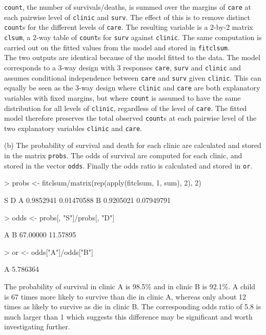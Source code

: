 \documentclass[a4paper,11pt]{article}
\begin{document}
\texttt{count}, the number of survivals/deaths, is summed over the margins of \texttt{care} at each pairwise level of \texttt{clinic} and \texttt{surv}. The effect of this is to remove distinct \texttt{count}s for the different levels of \texttt{care}. The resulting variable is a 2-by-2 matrix \texttt{clsum}, a 2-way table of \texttt{count}s for \texttt{surv} against \texttt{clinic}. The same computation is carried out on the fitted values from the model and stored in \texttt{fitclsum}.\\
The two outputs are identical because of the model fitted to the data. The model corresponds to a 3-way design with 3 responses \texttt{care}, \texttt{surv} and \texttt{clinic} and assumes conditional independence between \texttt{care} and \texttt{surv} given \texttt{clinic}. This can equally be seen as the 3-way design where \texttt{clinic} and \texttt{care} are both explanatory variables with fixed margins, but where \texttt{count} is assumed to have the same distribution for all levels of \texttt{clinic}, regardless of the level of \texttt{care}. The fitted model therefore preserves the total observed \texttt{count}s at each pairwise level of the two explanatory variables \texttt{clinic} and \texttt{care}.

(b) The probability of survival and death for each clinic are calculated and stored in the matrix \texttt{probs}. The odds of survival are computed for each clinic, and stored in the vector \texttt{odds}. Finally the odds ratio is calculated and stored in \texttt{or}.
\begin{Schunk}
\begin{Sinput}
> probs <- fitclsum/matrix(rep(apply(fitclsum, 1, sum), 2), 2)
\end{Sinput}
\begin{Soutput}
          S          D
A 0.9852941 0.01470588
B 0.9205021 0.07949791
\end{Soutput}
\begin{Sinput}
> odds <- probs[, "S"]/probs[, "D"]
\end{Sinput}
\begin{Soutput}
       A        B 
67.00000 11.57895 
\end{Soutput}
\begin{Sinput}
> or <- odds["A"]/odds["B"]
\end{Sinput}
\begin{Soutput}
       A 
5.786364 
\end{Soutput}
\end{Schunk}
The probability of survival in clinic A is
98.5\% and in clinic B is
92.1\%. A child is
67 times more likely to survive than die in clinic A, whereas only about
12 times as likely to survive as die in clinic B. The corresponding odds ratio of
5.8 is much larger than 1 which suggests this difference may be significant and worth investigating further.
\end{document}
